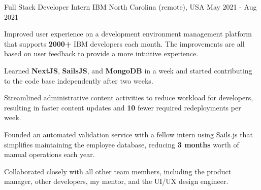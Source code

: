 \begin{cventries}
    \cventry
    {Full Stack Developer Intern} %
    {IBM} %
    {North Carolina (remote), USA} %
    {May 2021 - Aug 2021} %
    {
      \begin{cvitems} %
        \item {Improved user experience on a development environment management platform that supports \textbf{2000+} IBM developers each month. The improvements are all based on user feedback to provide a more intuitive experience.}
      \item {Learned \textbf{NextJS}, \textbf{SailsJS}, and \textbf{MongoDB} in a week and started contributing to the code base independently after two weeks.}
        \item {Streamlined administrative content activities to reduce workload for developers, resulting in faster content updates and \textbf{10} fewer required redeployments per week.}
        \item {Founded an automated validation service with a fellow intern using Sails.js that simplifies maintaining the employee database, reducing \textbf{3 months} worth of manual operations each year.}
        \item {Collaborated closely with all other team members, including the product manager, other developers, my mentor, and the UI/UX design engineer.}
      \end{cvitems}
    }



\end{cventries}
